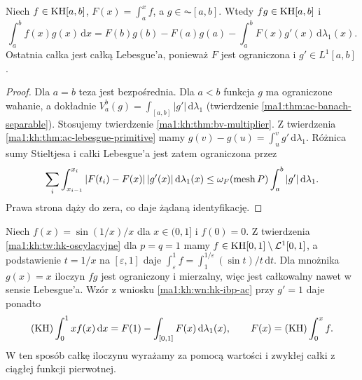 \begin{wniosek}\label{ma1:kh:wn:hk-ibp-ac}\label{wn:hk-ibp-ac}
Niech $f\in\mathrm{KH}[a,b]$, $F(x)=\int_a^x f$, a $g\in\AC[a,b]$. Wtedy $fg\in\mathrm{KH}[a,b]$ i
\[
\int_a^b f(x)g(x)\,\mathrm dx=F(b)g(b)-F(a)g(a)-\int_a^b F(x)g'(x)\,\mathrm d\lambda_1(x).
\]
Ostatnia całka jest całką Lebesgue'a, ponieważ $F$ jest ograniczona i $g'\in L^1[a,b]$.
\end{wniosek}
\begin{proof}
Dla $a=b$ teza jest bezpośrednia.
Dla $a<b$ funkcja $g$ ma ograniczone wahanie,
a dokładnie $V_a^b(g)=\int_{[a,b]}|g'|\,\mathrm d\lambda_1$
(twierdzenie \ref{ma1:thm:ac-banach-separable}). Stosujemy twierdzenie \ref{ma1:kh:thm:bv-multiplier}. Z twierdzenia \ref{ma1:kh:thm:ac-lebesgue-primitive} mamy $g(v)-g(u)=\int_u^v g'\,\mathrm d\lambda_1$. Różnica sumy Stieltjesa i całki Lebesgue'a jest zatem ograniczona przez
\[
 \sum_i\int_{x_{i-1}}^{x_i}|F(t_i)-F(x)|\,|g'(x)|\,\mathrm d\lambda_1(x)
 \le \omega_F(\operatorname{mesh} P)\int_a^b|g'|\,\mathrm d\lambda_1.
\]
Prawa strona dąży do zera, co daje żądaną identyfikację.
\end{proof}
\begin{przyklad}
Niech $f(x)=\sin(1/x)/x$ dla $x\in(0,1]$ i $f(0)=0$.
Z twierdzenia \ref{ma1:kh:tw:hk-oscylacyjne} dla $p=q=1$
mamy $f\in\mathrm{KH}[0,1]\setminus\mathcal L^1[0,1]$,
a podstawienie $t=1/x$ na $[\varepsilon,1]$
daje $\int_\varepsilon^1f=\int_1^{1/\varepsilon}(\sin t)/t\,\mathrm dt$.
Dla mnożnika $g(x)=x$ iloczyn $fg$ jest ograniczony
i mierzalny, więc jest całkowalny nawet w sensie Lebesgue'a.
Wzór z wniosku \ref{ma1:kh:wn:hk-ibp-ac} przy $g'=1$
daje ponadto
\[
 (\mathrm{KH})\int_0^1 x f(x)\,\mathrm dx
 =F(1)-\int_{[0,1]} F(x)\,\mathrm d\lambda_1(x),
 \qquad F(x)=(\mathrm{KH})\int_0^x f.
\]
W ten sposób całkę iloczynu wyrażamy za pomocą
wartości i zwykłej całki z ciągłej funkcji pierwotnej.
\end{przyklad}

